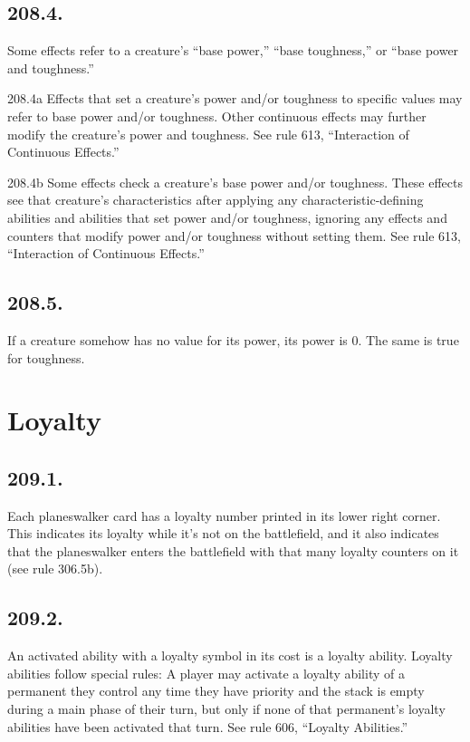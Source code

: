 \subsection*{208.4.}
Some effects refer to a creature’s “base power,” “base toughness,” or “base power and toughness.”

208.4a Effects that set a creature’s power and/or toughness to specific values may refer to base power and/or toughness. Other continuous effects may further modify the creature’s power and toughness. See rule 613, “Interaction of Continuous Effects.”

208.4b Some effects check a creature’s base power and/or toughness. These effects see that creature’s characteristics after applying any characteristic-defining abilities and abilities that set power and/or toughness, ignoring any effects and counters that modify power and/or toughness without setting them. See rule 613, “Interaction of Continuous Effects.”

\subsection*{208.5.}
If a creature somehow has no value for its power, its power is 0. The same is true for toughness.

\section{Loyalty}
\subsection*{209.1.}
Each planeswalker card has a loyalty number printed in its lower right corner. This indicates its loyalty while it’s not on the battlefield, and it also indicates that the planeswalker enters the battlefield with that many loyalty counters on it (see rule 306.5b).

\subsection*{209.2.}
An activated ability with a loyalty symbol in its cost is a loyalty ability. Loyalty abilities follow special rules: A player may activate a loyalty ability of a permanent they control any time they have priority and the stack is empty during a main phase of their turn, but only if none of that permanent’s loyalty abilities have been activated that turn. See rule 606, “Loyalty Abilities.”

